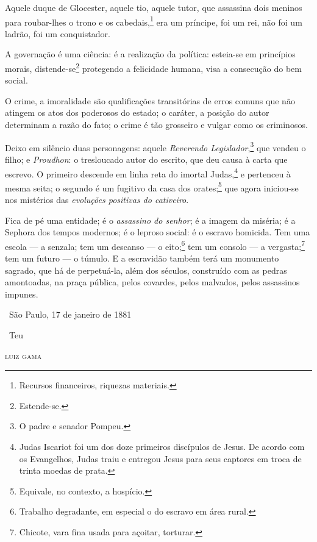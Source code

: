 {Aquele duque de Glocester, aquele tio, aquele tutor, que assassina dois
meninos para roubar-lhes o trono e os cabedais,\footnote{Recursos
  financeiros, riquezas materiais.} era um príncipe, foi um rei, não
foi um ladrão, foi um conquistador.

A governação é uma ciência: é a realização da política: esteia-se em
princípios morais, distende-se\footnote{Estende-se.} protegendo a
felicidade humana, visa a consecução do bem social.

O crime, a imoralidade são qualificações transitórias de erros comuns
que não atingem os atos dos poderosos do estado; o caráter, a posição do
autor determinam a razão do fato; o crime é tão grosseiro e vulgar como
os criminosos.

\asterisc

Deixo em silêncio duas personagens: aquele \emph{Reverendo
Legislador},\footnote{O padre e senador Pompeu.} que vendeu o filho; e
\emph{Proudhon}: o tresloucado autor do escrito, que deu causa à carta
que escrevo. O primeiro descende em linha reta do imortal
Judas,\footnote{Judas Iscariot foi um dos doze primeiros discípulos de \label{judas}
  Jesus. De acordo com os Evangelhos, Judas traiu e entregou Jesus para
  seus captores em troca de trinta moedas de prata.} e pertenceu à
mesma seita; o segundo é um fugitivo da casa dos orates;\footnote{
  Equivale, no contexto, a hospício.} que agora iniciou-se nos
mistérios das \emph{evoluções positivas do cativeiro}.

Fica de pé uma entidade; é o \emph{assassino do senhor}; é a imagem da
miséria; é a Sephora dos tempos modernos; é o leproso social: é o
escravo homicida. Tem uma escola --- a senzala; tem um descanso --- o
eito;\footnote{Trabalho degradante, em especial o do
  escravo em área rural.} tem um consolo --- a vergasta;\footnote{
  Chicote, vara fina usada para açoitar, torturar.}
tem um futuro --- o
túmulo. E a escravidão também terá um monumento sagrado, que há de
perpetuá-la, além dos séculos, construído com as pedras amontoadas, na
praça pública, pelos covardes, pelos malvados, pelos assassinos impunes.

\hfill\ São Paulo, 17 de janeiro de 1881

\hfill\ Teu

\hfill\textsc{luiz gama}


}

